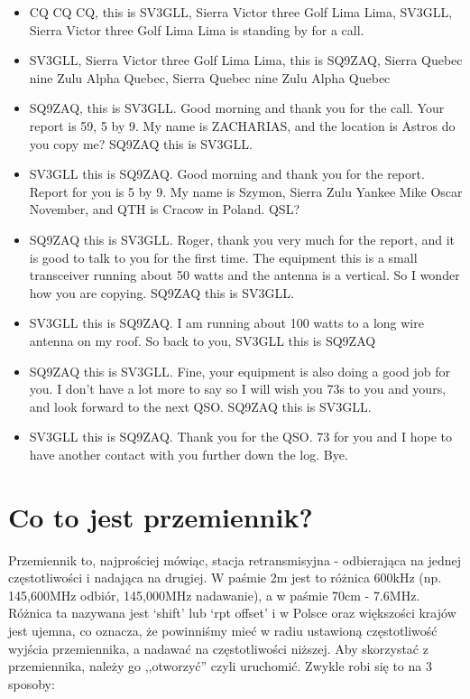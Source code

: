 \documentclass[a4paper,12pt]{article}
\begin{document}
\begin{itemize}
 \item CQ CQ CQ, this is SV3GLL, Sierra Victor three Golf Lima Lima, SV3GLL, Sierra Victor three Golf Lima Lima is standing by for a call.
 \item SV3GLL, Sierra Victor three Golf Lima Lima, this is SQ9ZAQ, Sierra Quebec nine Zulu Alpha Quebec, Sierra Quebec nine Zulu Alpha Quebec
 \item SQ9ZAQ, this is SV3GLL. Good morning and thank you for the call. Your report is 59, 5 by 9. My name is ZACHARIAS, and the location is Astros do you copy me? SQ9ZAQ this is SV3GLL.
 \item SV3GLL this is SQ9ZAQ. Good morning and thank you for the report. Report for you is 5 by 9. My name is Szymon, Sierra Zulu Yankee Mike Oscar November, and QTH is Cracow in Poland. QSL?
 \item SQ9ZAQ this is SV3GLL. Roger, thank you very much for the report, and it is good to talk to you for the first time. The equipment this is a small transceiver running about 50 watts and the antenna is a vertical. So I wonder how you are copying. SQ9ZAQ this is SV3GLL.
 \item SV3GLL this is SQ9ZAQ. I am running about 100 watts to a long wire antenna on my roof. So back to you, SV3GLL this is SQ9ZAQ
 \item SQ9ZAQ this is SV3GLL. Fine, your equipment is also doing a good job for you. I don't have a lot more to say so I will wish you 73s to you and yours, and look forward to the next QSO. SQ9ZAQ this is SV3GLL.
 \item SV3GLL this is SQ9ZAQ. Thank you for the QSO. 73 for you and I hope to have another contact with you further down the log. Bye.
\end{itemize}

\section{Co to jest przemiennik?}
Przemiennik to, najprościej mówiąc, stacja retransmisyjna - odbierająca na jednej częstotliwości i nadająca na drugiej. W paśmie 2m jest to różnica 600kHz (np. 145,600MHz odbiór, 145,000MHz nadawanie), a w paśmie 70cm - 7.6MHz. Różnica ta nazywana jest ‘shift’ lub ‘rpt offset’ i w Polsce oraz większości krajów jest ujemna, co oznacza, że powinniśmy mieć w radiu ustawioną częstotliwość wyjścia przemiennika, a nadawać na częstotliwości niższej. Aby skorzystać z przemiennika, należy go ,,otworzyć'' czyli uruchomić. Zwykle robi się to na 3 sposoby:
\end{document}
